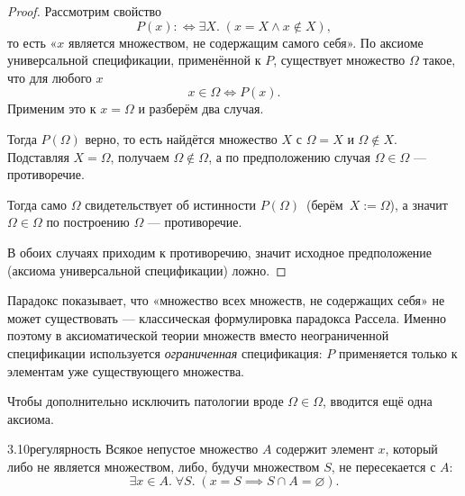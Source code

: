 \begin{proof}
Рассмотрим свойство
\[
  P(x) :\iff \exists X.\; (x = X \land x \notin X),
\]
то есть «$x$ является множеством, не содержащим самого себя». По аксиоме универсальной
спецификации, применённой к $P$, существует множество $\Omega$ такое, что для любого $x$
\[
  x \in \Omega \iff P(x).
\]
Применим это к $x = \Omega$ и разберём два случая.

\caselabel{$\Omega \in \Omega$} Тогда $P(\Omega)$ верно, то есть найдётся множество
$X$ с $\Omega = X$ и $\Omega \notin X$. Подставляя $X = \Omega$, получаем $\Omega \notin \Omega$,
а по предположению случая $\Omega \in \Omega$ — противоречие.

\caselabel{$\Omega \notin \Omega$} Тогда само $\Omega$ свидетельствует об истинности
$P(\Omega)$\mbox{ (берём $X := \Omega$)}, а значит $\Omega \in \Omega$ по построению
$\Omega$ — противоречие.

В обоих случаях приходим к противоречию, значит исходное предположение (аксиома универсальной
спецификации) ложно.
\end{proof}

\begin{remark}
Парадокс показывает, что «множество всех множеств, не содержащих себя» не может существовать —
классическая формулировка парадокса Рассела. Именно поэтому в аксиоматической теории множеств
вместо неограниченной спецификации используется \emph{ограниченная} спецификация: $P$
применяется только к элементам уже существующего множества.
\end{remark}

Чтобы дополнительно исключить патологии вроде $\Omega \in \Omega$, вводится ещё одна аксиома.

\begin{axiom}{3.10}{регулярность}
Всякое непустое множество $A$ содержит элемент $x$, который либо не является множеством, либо,
будучи множеством $S$, не пересекается с $A$:
\[
  \exists x \in A.\; \forall S.\; (x = S \implies S \cap A = \varnothing).
\]
\end{axiom}

